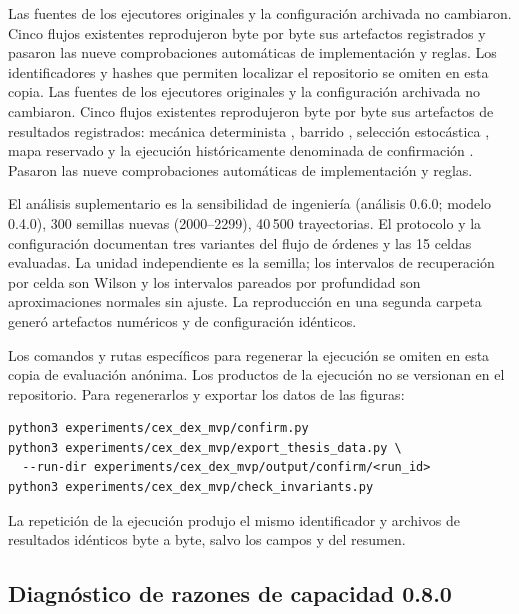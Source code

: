 \ifdefined\blindreviewmode
Las fuentes de los ejecutores originales y la configuración archivada no cambiaron. Cinco flujos existentes reprodujeron byte por byte sus artefactos registrados y pasaron las nueve comprobaciones automáticas de implementación y reglas. Los identificadores y hashes que permiten localizar el repositorio se omiten en esta copia.
\else
Las fuentes de los ejecutores originales y la configuración archivada no cambiaron. Cinco flujos existentes reprodujeron byte por byte sus artefactos de resultados registrados: mecánica determinista , barrido , selección estocástica , mapa reservado  y la ejecución históricamente denominada de confirmación . Pasaron las nueve comprobaciones automáticas de implementación y reglas.
\fi

El análisis suplementario es la sensibilidad de ingeniería (análisis 0.6.0; modelo 0.4.0), 300 semillas nuevas (2000--2299), 40\,500 trayectorias. El protocolo y la configuración documentan tres variantes del flujo de órdenes y las 15 celdas evaluadas. La unidad independiente es la semilla; los intervalos de recuperación por celda son Wilson y los intervalos pareados por profundidad son aproximaciones normales sin ajuste. La reproducción en una segunda carpeta generó artefactos numéricos y de configuración idénticos.

\ifdefined\blindreviewmode
Los comandos y rutas específicos para regenerar la ejecución se omiten en esta copia de evaluación anónima.
\else
Los productos de la ejecución no se versionan en el repositorio. Para regenerarlos y exportar los datos de las figuras:

\begin{verbatim}
python3 experiments/cex_dex_mvp/confirm.py
python3 experiments/cex_dex_mvp/export_thesis_data.py \
  --run-dir experiments/cex_dex_mvp/output/confirm/<run_id>
python3 experiments/cex_dex_mvp/check_invariants.py
\end{verbatim}
\fi

La repetición de la ejecución produjo el mismo identificador y archivos de resultados idénticos byte a byte, salvo los campos  y  del resumen.

\subsection*{Diagnóstico de razones de capacidad 0.8.0}

